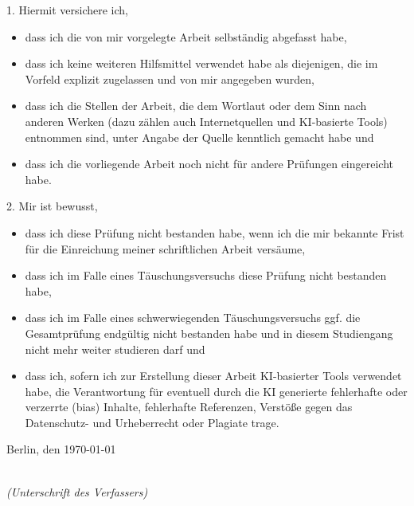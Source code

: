 \newpage
\thispagestyle{empty}
\noindent

1. Hiermit versichere ich,
\begin{itemize}
    \item dass ich die von mir vorgelegte Arbeit selbständig abgefasst habe,
    \item dass ich keine weiteren Hilfsmittel verwendet habe als diejenigen, die im Vorfeld explizit zugelassen und von mir angegeben wurden,
    \item dass ich die Stellen der Arbeit, die dem Wortlaut oder dem Sinn nach anderen Werken (dazu zählen auch Internetquellen und KI-basierte Tools) entnommen sind, unter Angabe der Quelle kenntlich gemacht habe und
    \item dass ich die vorliegende Arbeit noch nicht für andere Prüfungen eingereicht habe.
\end{itemize}
2. Mir ist bewusst,
\begin{itemize}
    \item dass ich diese Prüfung nicht bestanden habe, wenn ich die mir bekannte Frist für die Einreichung meiner schriftlichen Arbeit versäume,
    \item dass ich im Falle eines Täuschungsversuchs diese Prüfung nicht bestanden habe,
    \item dass ich im Falle eines schwerwiegenden Täuschungsversuchs ggf. die Gesamtprüfung endgültig nicht bestanden habe und in diesem Studiengang nicht mehr weiter studieren darf und
    \item dass ich, sofern ich zur Erstellung dieser Arbeit KI-basierter Tools verwendet habe, die Verantwortung für eventuell durch die KI generierte fehlerhafte oder verzerrte (bias) Inhalte, fehlerhafte Referenzen, Verstöße gegen das Datenschutz- und Urheberrecht oder Plagiate trage.
\end{itemize}

\vspace{2cm}

\noindent
Berlin, den \today

\vspace{3cm}

\hspace*{7cm}%
\dotfill\\
\hspace*{8.5cm}%
\textit{(Unterschrift des Verfassers)}
